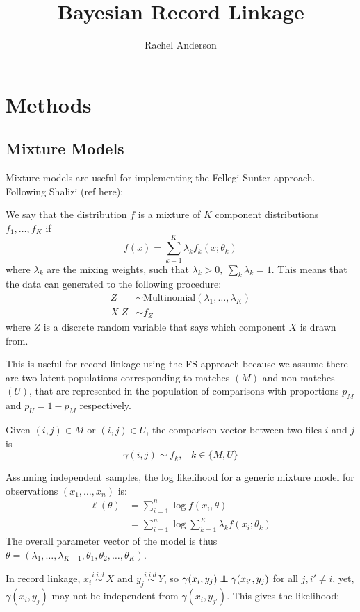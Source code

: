 \documentclass[11pt,reqno]{amsart}
\title{Bayesian Record Linkage}
\author{Rachel Anderson}
\newcommand\independent{\protect\mathpalette{\protect\independenT}{\perp}}
\def\independenT#1#2{\mathrel{\rlap{$#1#2$}\mkern2mu{#1#2}}}
\begin{document}
\maketitle

\section{Methods}
\subsection{Mixture Models}
Mixture models are useful for implementing the Fellegi-Sunter approach.  Following Shalizi (ref here):  

We say that the distribution $f$ is a mixture of $K$ component distributions $f_1, \dots, f_K$ if 
\[ f(x) = \sum_{k=1}^K \lambda_k f_k(x; \theta_k) \] 
where $\lambda_k$ are the mixing weights, such that $\lambda_k>0, \ \sum_k \lambda_k = 1$.  This means that the data can generated to the following procedure: 
\begin{align*}
Z &\sim \text{Multinomial}(\lambda_1, \dots, \lambda_K) \\
X | Z &\sim f_{Z}
\end{align*}
where $Z$ is a discrete random variable that says which component $X$ is drawn from. 

This is useful for record linkage using the FS approach because we assume there are two latent populations corresponding to matches $(M)$ and non-matches $(U)$, that are represented in the population of comparisons with proportions $p_M$ and $p_U = 1 - p_M$ respectively.  


Given $(i,j) \in M$ or $ (i,j)\in U$, the comparison vector between two files $i$ and $j$ is
\[ \gamma(i,j) \sim f_{k}, \hspace{10pt} k\in\{M,U\} \]


Assuming independent samples, the log likelihood for a generic mixture model for observations $(x_1,\dots, x_n)$ is:
\begin{align} 
\ell(\theta) &= \sum_{i=1}^n \log f(x_i,\theta)  \\
		&= \sum_{i=1}^n \log \sum_{k=1}^K \lambda_k f(x_i; \theta_k)  \label{eq:llh}
\end{align}
The overall parameter vector of the model is thus $\theta = (\lambda_1,\dots,\lambda_{K-1}, \theta_1, \theta_2, \dots, \theta_K)$.  

In record linkage, $x_i \overset{i.i.d.}{\sim}X$ and $y_j  \overset{i.i.d.}{\sim} Y$, so $\gamma(x_i, y_j) \independent \gamma(x_{i'}, y_j)$ for all  $j, i'\neq i$, yet, $\gamma(x_i,y_j) $ may not be independent from $\gamma(x_i,y_{j'})$.  This gives the likelihood:
\end{document}
